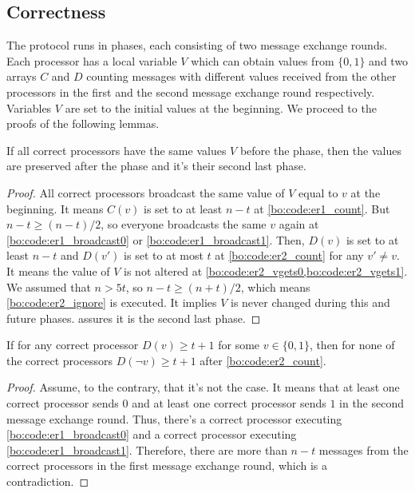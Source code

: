 \subsection{Correctness}
The protocol runs in phases, each consisting of two message exchange rounds. Each processor has a local variable $V$ which can obtain values from $\{0,1\}$ and two arrays $C$ and $D$ counting messages with different values received from the other processors in the first and the second message exchange round respectively. Variables $V$ are set to the initial values at the beginning. We proceed to the proofs of the following lemmas.

\begin{lemma}\label{bo:lem:preserve}
If all correct processors have the same values $V$ before the phase, then the values are preserved after the phase and it's their second last phase.
\end{lemma}
\begin{proof}
All correct processors broadcast the same value of $V$ equal to $v$ at the beginning. It means $C(v)$ is set to at least $n-t$ at \cref{bo:code:er1_count}. But $n-t \geq (n-t)/2$, so everyone broadcasts the same $v$ again at \cref{bo:code:er1_broadcast0} or \cref{bo:code:er1_broadcast1}. Then, $D(v)$ is set to at least $n-t$ and $D(v')$ is set to at most $t$ at \cref{bo:code:er2_count} for any $v'\neq v$. It means the value of $V$ is not altered at \cref{bo:code:er2_vgets0,bo:code:er2_vgets1}. We assumed that $n>5t$, so $n-t\geq (n+t)/2$, which means \cref{bo:code:er2_ignore} is executed. It implies $V$ is never changed during this and future phases.  assures it is the second last phase.
\end{proof}

\begin{lemma}\label{bo:lem:oneassign}
If for any correct processor $D(v) \geq t+1$ for some $v \in \{0, 1\}$, then for none of the correct processors $D(\neg v) \geq t+1$ after \cref{bo:code:er2_count}.
\end{lemma}
\begin{proof}
Assume, to the contrary, that it's not the case. It means that at least one correct processor sends $0$ and at least one correct processor sends $1$ in the second message exchange round. Thus, there's a correct processor executing \cref{bo:code:er1_broadcast0} and a correct processor executing \cref{bo:code:er1_broadcast1}. Therefore, there are more than $n-t$ messages from the correct processors in the first message exchange round, which is a contradiction.
\end{proof}

